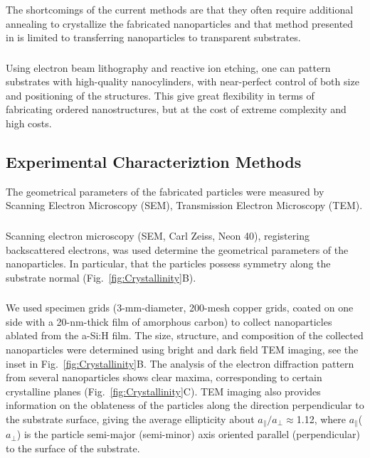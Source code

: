                 The shortcomings of the current methods are that they often require additional annealing to crystallize the fabricated nanoparticles and that
            method presented in \cite{zywietz2014laser} is limited to transferring nanoparticles to transparent substrates.

        \subsubsection{}
                Using electron beam lithography and reactive ion etching, one can pattern substrates with high-quality nanocylinders, with near-perfect
            control of both size and positioning of the structures\cite{bakker2015magnetic}. This give great flexibility in terms of fabricating ordered nanostructures, but at the
            cost of extreme complexity and high costs.

    \subsection{Experimental Characteriztion Methods}
    \label{sec:SEM}
            The geometrical parameters of the fabricated particles were measured by Scanning Electron Microscopy (SEM),
        Transmission Electron Microscopy (TEM).

        \subsubsection{}
                Scanning electron microscopy (SEM, Carl Zeiss, Neon 40), registering backscattered electrons, was used
            determine the geometrical parameters of the nanoparticles. In particular, that the particles possess 
            symmetry along the substrate normal (Fig.~\ref{fig:Crystallinity}B).

        \subsubsection{}
                We used specimen grids (3-mm-diameter, 200-mesh copper grids, coated on one side with a 20-nm-thick film
            of amorphous carbon) to collect nanoparticles ablated from the a-Si:H film. The size, structure, and composition
            of the collected nanoparticles were determined using bright and dark field TEM imaging, see the inset in
            Fig.~\ref{fig:Crystallinity}B. The analysis of the electron diffraction pattern from several nanoparticles shows clear maxima,
            corresponding to certain crystalline planes (Fig.~\ref{fig:Crystallinity}C).  TEM imaging also provides information
            on the oblateness of the particles along the direction perpendicular to the substrate surface, giving
            the average ellipticity about $a_{\parallel}/a_{\perp}\approx$1.12, where $a_{\parallel}$($a_{\perp}$) is
            the particle semi-major (semi-minor) axis oriented parallel (perpendicular) to the surface of the substrate.

